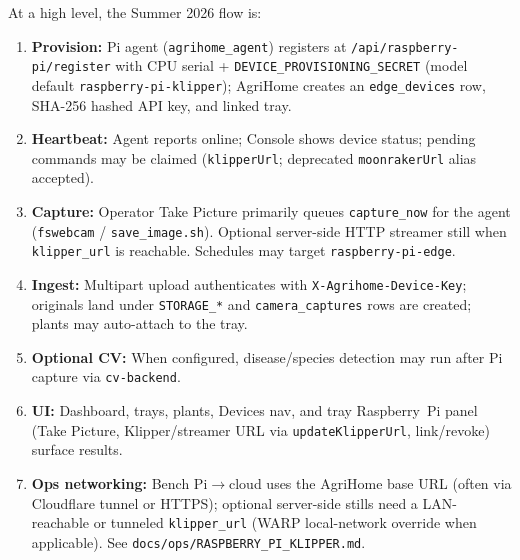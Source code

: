 \documentclass[11pt,letterpaper]{article}
\begin{document}
At a high level, the Summer 2026 flow is:
\begin{enumerate}
  \item \textbf{Provision:} Pi agent (\texttt{agrihome\_agent}) registers at
        \texttt{/api/raspberry-pi/register} with CPU serial + \texttt{DEVICE\_PROVISIONING\_SECRET}
        (model default \texttt{raspberry-pi-klipper}); AgriHome creates an \texttt{edge\_devices}
        row, SHA-256 hashed API key, and linked tray.
  \item \textbf{Heartbeat:} Agent reports online; Console shows device status; pending commands may
        be claimed (\texttt{klipperUrl}; deprecated \texttt{moonrakerUrl} alias accepted).
  \item \textbf{Capture:} Operator Take Picture primarily queues \texttt{capture\_now} for the agent
        (\texttt{fswebcam} / \texttt{save\_image.sh}). Optional server-side HTTP streamer still when
        \texttt{klipper\_url} is reachable. Schedules may target \texttt{raspberry-pi-edge}.
  \item \textbf{Ingest:} Multipart upload authenticates with \texttt{X-Agrihome-Device-Key}; originals
        land under \texttt{STORAGE\_*} and \texttt{camera\_captures} rows are created; plants may
        auto-attach to the tray.
  \item \textbf{Optional CV:} When configured, disease/species detection may run after Pi capture
        via \texttt{cv-backend}.
  \item \textbf{UI:} Dashboard, trays, plants, Devices nav, and tray Raspberry~Pi panel (Take Picture,
        Klipper/streamer URL via \texttt{updateKlipperUrl}, link/revoke) surface results.
  \item \textbf{Ops networking:} Bench Pi$\rightarrow$cloud uses the AgriHome base URL (often via
        Cloudflare tunnel or HTTPS); optional server-side stills need a LAN-reachable or tunneled
        \texttt{klipper\_url} (WARP local-network override when applicable). See
        \texttt{docs/ops/RASPBERRY\_PI\_KLIPPER.md}.
\end{enumerate}
\end{document}
